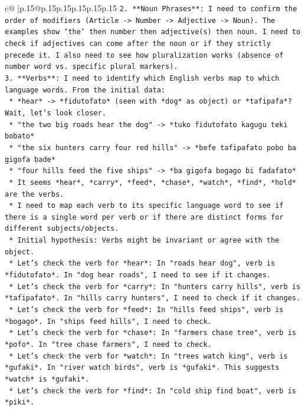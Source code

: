 \documentclass{article}
\begin{document}
{\begin{supertabular}{c@{$\;$}|p{.15\linewidth}@{}p{.15\linewidth}p{.15\linewidth}p{.15\linewidth}p{.15\linewidth}p{.15\linewidth}}
{{{\texttt{2.  **Noun Phrases**: I need to confirm the order of modifiers (Article {-}> Number {-}> Adjective {-}> Noun). The examples show `the` then number then adjective(s) then noun. I need to check if adjectives can come after the noun or if they strictly precede it. I also need to see how pluralization works (absence of number word vs. specific plural markers).} \\
\texttt{3.  **Verbs**: I need to identify which English verbs map to which language words. From the initial data:} \\
\texttt{    *   *hear* {-}> *fidutofato* (seen with *dog* as object) or *tafipafa*? Wait, let's look closer.} \\
\texttt{        *   "the two big roads hear the dog" {-}> *tuko fidutofato kagugu teki bobato*} \\
\texttt{        *   "the six hunters carry four red hills" {-}> *befe tafipafato pobo ba gigofa bade*} \\
\texttt{        *   "four hills feed the five ships" {-}> *ba gigofa bogago bi fadafato*} \\
\texttt{    *   It seems *hear*, *carry*, *feed*, *chase*, *watch*, *find*, *hold* are the verbs.} \\
\texttt{    *   I need to map each verb to its specific language word to see if there is a single word per verb or if there are distinct forms for different subjects/objects.} \\
\texttt{    *   Initial hypothesis: Verbs might be invariant or agree with the object.} \\
\texttt{    *   Let's check the verb for *hear*: In "roads hear dog", verb is *fidutofato*. In "dog hear roads", I need to see if it changes.} \\
\texttt{    *   Let's check the verb for *carry*: In "hunters carry hills", verb is *tafipafato*. In "hills carry hunters", I need to check if it changes.} \\
\texttt{    *   Let's check the verb for *feed*: In "hills feed ships", verb is *bogago*. In "ships feed hills", I need to check.} \\
\texttt{    *   Let's check the verb for *chase*: In "farmers chase tree", verb is *pofo*. In "tree chase farmers", I need to check.} \\
\texttt{    *   Let's check the verb for *watch*: In "trees watch king", verb is *gufaki*. In "river watch birds", verb is *gufaki*. This suggests *watch* is *gufaki*.} \\
\texttt{    *   Let's check the verb for *find*: In "cold ship find boat", verb is *piki*.} \\
}}}
\end{supertabular}}
\end{document}

